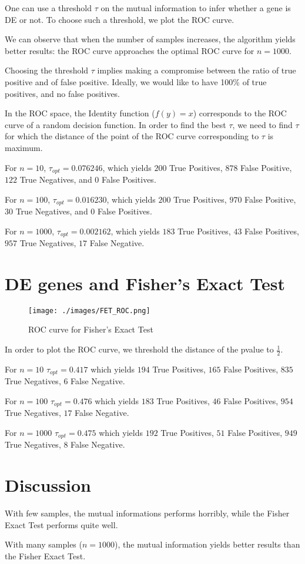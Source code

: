 \documentclass{article}
\begin{document}
One can use a threshold $\tau$ on the mutual information to infer whether a
gene is DE or not. To choose such a threshold, we plot the ROC curve.

We can observe that when the number of samples increases, the algorithm yields
better results: the ROC curve approaches the optimal ROC curve for $n = 1000$.

Choosing the threshold $\tau$ implies making a compromise between the ratio of
true positive and of false positive. Ideally, we would like to have 100\% of
true positives, and no false positives.

In the ROC space, the Identity function ($f(y) = x$) corresponds to the ROC
curve of a random decision function. In order to find the best $\tau$, we need
to find $\tau$ for which the distance of the point of the ROC curve
corresponding to $\tau$ is maximum.

For $n=10$, $\tau_{opt} = 0.076246$, which yields $200$ True Positives, $878$
False Positive, $122$ True Negatives, and $0$ False Positives.

For $n=100$, $\tau_{opt} = 0.016230$, which yields $200$ True Positives, $970$
False Positive, $30$ True Negatives, and $0$ False Positives.

For $n = 1000$, $\tau_{opt} = 0.002162$, which yields $183$ True Positives, $43$
False Positives, $957$ True Negatives, $17$ False Negative.


\section{DE genes and Fisher's Exact Test}
\begin{figure}
\begin{center}
\texttt{[image: ./images/FET\_ROC.png]}
\end{center}
\caption{ROC curve for Fisher's Exact Test}
\end{figure}

In order to plot the ROC curve, we threshold the distance of the pvalue to
$\frac{1}{2}$.

For $n=10$ $\tau_{opt} = 0.417$ which yields $194$ True Positives, $165$
False Positives, $835$ True Negatives, $6$ False Negative.

For $n=100$ $\tau_{opt} = 0.476$ which yields $183$ True Positives, $46$
False Positives, $954$ True Negatives, $17$ False Negative.

For $n=1000$ $\tau_{opt} = 0.475$ which yields $192$ True Positives, $51$
False Positives, $949$ True Negatives, $8$ False Negative.

\section{Discussion}
With few samples, the mutual informations performs horribly, while the Fisher
Exact Test performs quite well.

With many samples ($n=1000$), the mutual information yields better results
than the Fisher Exact Test.
\end{document}
